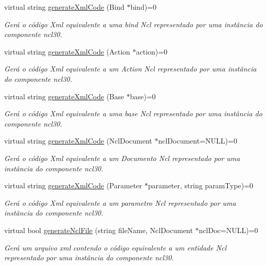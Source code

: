 \begin{DoxyCompactItemize}
virtual string \hyperlink{classbr_1_1ufscar_1_1lince_1_1ncl_1_1generator_1_1INclGenerator_ab868d963b3ca0de3cfc108939731475f}{generateXmlCode} (Bind $\ast$bind)=0
\begin{DoxyCompactList}\small\item\em Gerá o código Xml equivalente a uma bind Ncl representado por uma instância do componente ncl30. \item\end{DoxyCompactList}\item 
virtual string \hyperlink{classbr_1_1ufscar_1_1lince_1_1ncl_1_1generator_1_1INclGenerator_a6a5fcbb5969d970eef4e5ea8826c84c6}{generateXmlCode} (Action $\ast$action)=0
\begin{DoxyCompactList}\small\item\em Gerá o código Xml equivalente a um Action Ncl representado por uma instância do componente ncl30. \item\end{DoxyCompactList}\item 
virtual string \hyperlink{classbr_1_1ufscar_1_1lince_1_1ncl_1_1generator_1_1INclGenerator_a185d2e61f3100bcb6168c229c640e5fc}{generateXmlCode} (Base $\ast$base)=0
\begin{DoxyCompactList}\small\item\em Gerá o código Xml equivalente a uma base Ncl representado por uma instância do componente ncl30. \item\end{DoxyCompactList}\item 
virtual string \hyperlink{classbr_1_1ufscar_1_1lince_1_1ncl_1_1generator_1_1INclGenerator_a396181e0d4b4d7e53addd5a25ffa839b}{generateXmlCode} (NclDocument $\ast$nclDocument=NULL)=0
\begin{DoxyCompactList}\small\item\em Gerá o código Xml equivalente a um Documento Ncl representado por uma instância do componente ncl30. \item\end{DoxyCompactList}\item 
virtual string \hyperlink{classbr_1_1ufscar_1_1lince_1_1ncl_1_1generator_1_1INclGenerator_aa3110ec3a080b9d990c7b02dae573a85}{generateXmlCode} (Parameter $\ast$parameter, string paramType)=0
\begin{DoxyCompactList}\small\item\em Gerá o código Xml equivalente a um parametro Ncl representado por uma instância do componente ncl30. \item\end{DoxyCompactList}\item 
virtual bool \hyperlink{classbr_1_1ufscar_1_1lince_1_1ncl_1_1generator_1_1INclGenerator_a9d4259cf5746aec2541681148937057b}{generateNclFile} (string fileName, NclDocument $\ast$nclDoc=NULL)=0
\begin{DoxyCompactList}\small\item\em Gerá um arquivo xml contendo o código equivalente a um entidade Ncl representado por uma instância do componente ncl30. \item\end{DoxyCompactList}\end{DoxyCompactItemize}


